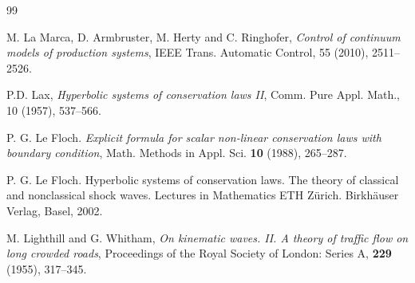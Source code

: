\documentclass[a4paper, 10pt, final]{article}
\begin{document}
\begin{thebibliography}{99}
    

  


M. La Marca, D. Armbruster, M. Herty and C. Ringhofer,  \textsl{Control of continuum models of
production systems}, IEEE Trans. Automatic Control, 55 (2010), 2511--2526.

 P.D. Lax, \textsl{Hyperbolic systems of conservation laws II}, Comm. Pure Appl. Math., 10 (1957),
537--566.
%
    
 P. G. Le Floch.  \textsl{Explicit formula for scalar
non-linear conservation laws with boundary condition},
Math. Methods in Appl. Sci. \textbf{10} (1988), 265--287.

 P. G. Le Floch. Hyperbolic systems of conservation
  laws.  The theory of classical and nonclassical shock
waves. Lectures in Mathematics ETH
Z\"urich. Birkh\"auser Verlag, Basel, 2002.

    
%
%   
 M. Lighthill and G. Whitham, \textsl{On kinematic waves. II. A theory of traffic flow on long crowded roads}, Proceedings of the Royal Society of London: Series A, \textbf{229} (1955), 317--345.
%


\end{thebibliography}
\end{document}
